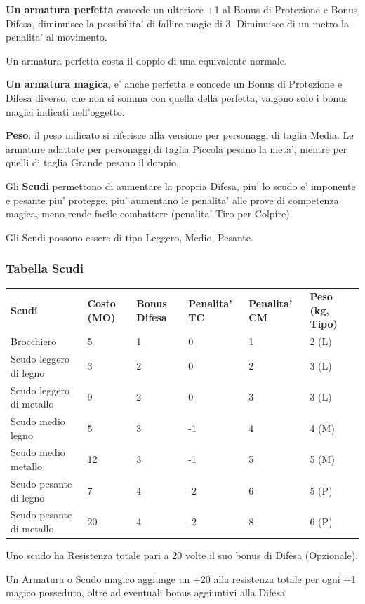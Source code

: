 \documentclass[a4paper,11pt,twoside,openany]{book}
\begin{document}
{\textbf{Un armatura perfetta} concede un ulteriore +1 al Bonus di Protezione e Bonus Difesa, diminuisce la possibilita' di fallire magie di 3. Diminuisce di un metro la penalita' al movimento. 

Un armatura perfetta costa il doppio di una equivalente normale.

\textbf{Un armatura magica}, e' anche perfetta e concede un Bonus di Protezione e Difesa diverso, che non si somma con quella della perfetta, valgono solo i bonus magici indicati nell'oggetto.

\textbf{Peso}: il peso indicato si riferisce alla versione per personaggi di taglia Media. Le armature adattate per personaggi di taglia Piccola pesano la meta', mentre per quelli di taglia Grande pesano il doppio.

\pagebreak

Gli \textbf{Scudi} permettono di aumentare la propria Difesa, piu' lo scudo e' imponente e pesante piu' protegge, piu' aumentano le penalita' alle prove di competenza magica, meno rende facile combattere (penalita' Tiro per Colpire).

Gli Scudi possono essere di tipo Leggero, Medio, Pesante.

\subsubsection{Tabella Scudi}

\label{tabella-scudi}
\medskip
\begin{tabular}{llllll}
\toprule
\textbf{Scudi} & \textbf{Costo (MO)} & \textbf{Bonus Difesa} & \textbf{Penalita' TC} & \textbf{Penalita' CM} & \textbf{Peso (kg, Tipo)}\tabularnewline
Brocchiero & 5 & 1 & 0 & 1 & 2 (L)\tabularnewline
Scudo leggero di legno & 3 & 2 & 0 & 2 & 3 (L)\tabularnewline
Scudo leggero di metallo & 9 & 2 & 0 & 3 & 3 (L)\tabularnewline
Scudo medio legno & 5 & 3 & -1 & 4 & 4 (M)\tabularnewline
Scudo medio metallo & 12 & 3 & -1 & 5 & 5 (M)\tabularnewline
Scudo pesante di legno & 7 & 4 & -2 & 6 & 5 (P)\tabularnewline
Scudo pesante di metallo & 20 & 4 & -2 & 8 & 6 (P)\tabularnewline
\end{tabular}

Uno scudo ha Resistenza totale pari a 20 volte il suo bonus di Difesa (Opzionale).

\bigskip

Un Armatura o Scudo magico aggiunge un +20 alla resistenza totale
per ogni +1 magico posseduto, oltre ad eventuali bonus aggiuntivi
alla Difesa 

}
\end{document}
